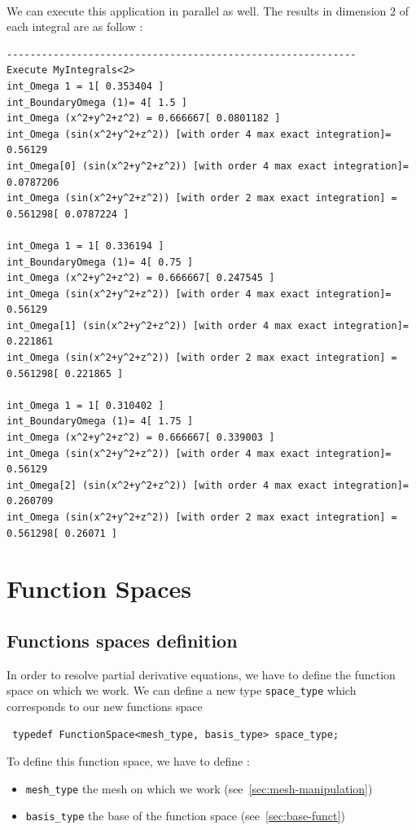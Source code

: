 \\We can execute this application in parallel as well. The results in dimension 2 of each integral are as follow : \\
\begin{lstlisting}
------------------------------------------------------------
Execute MyIntegrals<2>
int_Omega 1 = 1[ 0.353404 ]
int_BoundaryOmega (1)= 4[ 1.5 ]
int_Omega (x^2+y^2+z^2) = 0.666667[ 0.0801182 ]
int_Omega (sin(x^2+y^2+z^2)) [with order 4 max exact integration]= 0.56129
int_Omega[0] (sin(x^2+y^2+z^2)) [with order 4 max exact integration]= 0.0787206
int_Omega (sin(x^2+y^2+z^2)) [with order 2 max exact integration] = 0.561298[ 0.0787224 ]

int_Omega 1 = 1[ 0.336194 ]
int_BoundaryOmega (1)= 4[ 0.75 ]
int_Omega (x^2+y^2+z^2) = 0.666667[ 0.247545 ]
int_Omega (sin(x^2+y^2+z^2)) [with order 4 max exact integration]= 0.56129
int_Omega[1] (sin(x^2+y^2+z^2)) [with order 4 max exact integration]= 0.221861
int_Omega (sin(x^2+y^2+z^2)) [with order 2 max exact integration] = 0.561298[ 0.221865 ]

int_Omega 1 = 1[ 0.310402 ]
int_BoundaryOmega (1)= 4[ 1.75 ]
int_Omega (x^2+y^2+z^2) = 0.666667[ 0.339003 ]
int_Omega (sin(x^2+y^2+z^2)) [with order 4 max exact integration]= 0.56129
int_Omega[2] (sin(x^2+y^2+z^2)) [with order 4 max exact integration]= 0.260709
int_Omega (sin(x^2+y^2+z^2)) [with order 2 max exact integration] = 0.561298[ 0.26071 ]
\end{lstlisting}



\section{Function Spaces}

\label{sec:func-spaces}

\subsection{Functions spaces definition}

In order to resolve partial derivative equations, we have to define the function space on which we work.
We can define a new type \lstinline!space_type! which corresponds to our new functions space
\begin{lstlisting}
 typedef FunctionSpace<mesh_type, basis_type> space_type;
\end{lstlisting}
To define this function space, we have to define :
\begin{itemize}
 \item \lstinline!mesh_type! the mesh on which we work (see~\ref{sec:mesh-manipulation})
 \item \lstinline!basis_type! the base of the function space (see~\ref{sec:base-funct})
\end{itemize}

